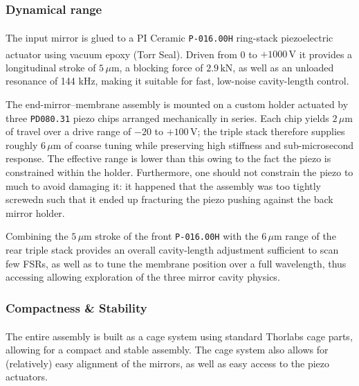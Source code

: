 \subsubsection{Dynamical range}

The input mirror is glued to a PI Ceramic\textsuperscript{\textregistered} \texttt{P-016.00H} ring-stack piezoelectric actuator using vacuum epoxy (Torr Seal\textsuperscript{\textregistered}). Driven from 0 to $+1000\,\mathrm{V}$ it provides a longitudinal stroke of $5\,\mu\text{m}$, a blocking force of $2.9\,\mathrm{kN}$, as well as an unloaded resonance of 144 kHz, making it suitable for fast, low-noise cavity-length control.

The end-mirror–membrane assembly is mounted on a custom holder actuated by three \texttt{PD080.31} piezo chips arranged mechanically in series. Each chip yields $2\,\mu\text{m}$ of travel over a drive range of $-20$ to $+100\,\mathrm{V}$; the triple stack therefore supplies roughly $6\,\mu\text{m}$ of coarse tuning while preserving high stiffness and sub-microsecond response. The effective range is lower than this owing to the fact the piezo is constrained within the holder. Furthermore, one should not constrain the piezo to much to avoid damaging it: it happened that the assembly was too tightly screwedn such that it ended up fracturing the piezo pushing against the back mirror holder. 

Combining the $5\,\mu\text{m}$ stroke of the front \texttt{P-016.00H} with the $6\,\mu\text{m}$ range of the rear triple stack provides an overall cavity-length adjustment sufficient to scan few FSRs, as well as to tune the membrane position over a full wavelength, thus accessing allowing exploration of the three mirror cavity physics.


\subsubsection{Compactness \& Stability}
The entire assembly is built as a cage system using standard Thorlabs\textsuperscript{\textregistered} cage parts, allowing for a compact and stable assembly. The cage system also allows for (relatively) easy alignment of the mirrors, as well as easy access to the piezo actuators.

